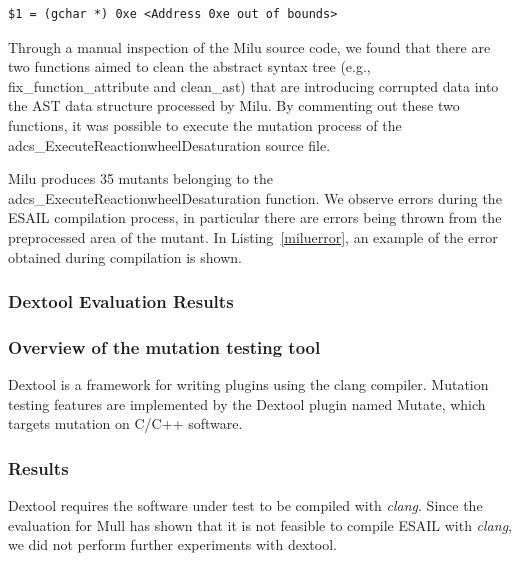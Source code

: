 \noindent\begin{minipage}{0.8\textwidth}
\begin{lstlisting}[language={}]
$1 = (gchar *) 0xe <Address 0xe out of bounds>
\end{lstlisting}
\end{minipage}

Through a manual inspection of the Milu source code, we found that there are two functions aimed to clean the abstract syntax tree (e.g., fix\_function\_attribute and clean\_ast) that are introducing corrupted data into the AST data structure processed by Milu.
By commenting out these two functions, it was possible to execute the mutation process of the adcs\_ExecuteReactionwheelDesaturation source file.

Milu produces 35 mutants belonging to the adcs\_ExecuteReactionwheelDesaturation function.
 We observe errors during the ESAIL compilation process, in particular there are errors being thrown from the preprocessed area of the mutant. In Listing~\ref{miluerror}, an example of the error obtained during compilation is shown.



\subsubsection{Dextool Evaluation Results}
\label{subsec:dextool}

\subsubsection{Overview of the mutation testing tool}

Dextool is a framework for writing plugins using the clang compiler. Mutation testing features are implemented by the Dextool plugin named Mutate, which targets mutation on C/C++ software.

\subsubsection{Results}

Dextool requires the software under test to be compiled with \emph{clang}.
Since the evaluation for Mull has shown that it is not feasible to compile ESAIL with \emph{clang}, we did not perform further experiments with dextool.



